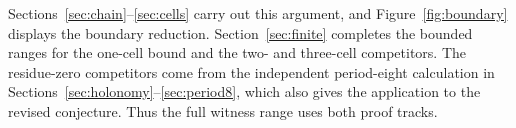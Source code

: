 Sections~\ref{sec:chain}--\ref{sec:cells} carry out this argument, and
Figure~\ref{fig:boundary} displays the boundary reduction.
Section~\ref{sec:finite} completes the bounded ranges for the one-cell
bound and the two- and three-cell competitors. The residue-zero
competitors come from the independent period-eight calculation in
Sections~\ref{sec:holonomy}--\ref{sec:period8}, which also gives the
application to the revised conjecture. Thus the full witness range uses
both proof tracks.
